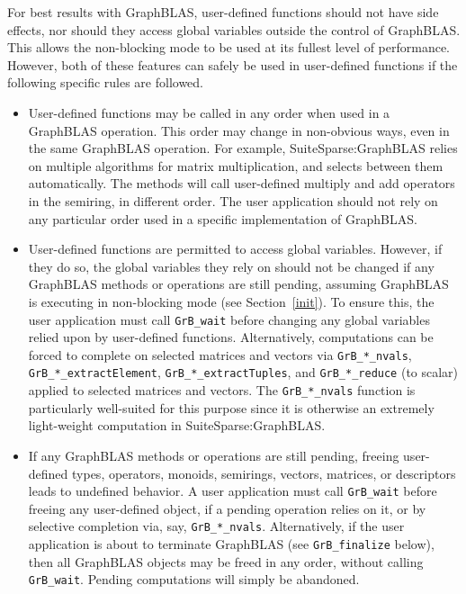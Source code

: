 \documentclass[12pt]{article}
\begin{document}
For best results with GraphBLAS, user-defined functions should not have side
effects, nor should they access global variables outside the control of
GraphBLAS.  This allows the non-blocking mode to be used at its fullest level
of performance.  However, both of these features can safely be used in
user-defined functions if the following specific rules are followed.

\begin{itemize}

\item User-defined functions may be called in any order when used in a
    GraphBLAS operation.  This order may change in non-obvious ways, even in
    the same GraphBLAS operation.  For example, SuiteSparse:\-GraphBLAS relies
    on multiple algorithms for matrix multiplication, and selects between them
    automatically.  The methods will call user-defined multiply and add
    operators in the semiring, in different order.  The user application should
    not rely on any particular order used in a specific implementation of
    GraphBLAS.

\item User-defined functions are permitted to access global variables.
    However, if they do so, the global variables they rely on should not be
    changed if any GraphBLAS methods or operations are still pending, assuming
    GraphBLAS is executing in non-blocking mode (see Section~\ref{init}).  To
    ensure this, the user application must call \verb'GrB_wait' before changing
    any global variables relied upon by user-defined functions.  Alternatively,
    computations can be forced to complete on selected matrices and vectors via
    \verb'GrB_*_nvals', \verb'GrB_*_extractElement',
    \verb'GrB_*_extractTuples', and \verb'GrB_*_reduce' (to scalar) applied to
    selected matrices and vectors.  The \verb'GrB_*_nvals' function is
    particularly well-suited for this purpose since it is otherwise an
    extremely light-weight computation in SuiteSparse:GraphBLAS.

\item If any GraphBLAS methods or operations are still pending, freeing
    user-defined types, operators, monoids, semirings, vectors, matrices, or
    descriptors leads to undefined behavior.  A user application must call
    \verb'GrB_wait' before freeing any user-defined object, if a pending
    operation relies on it, or by selective completion via, say,
    \verb'GrB_*_nvals'.  Alternatively, if the user application is about to
    terminate GraphBLAS (see \verb'GrB_finalize' below), then all GraphBLAS
    objects may be freed in any order, without calling \verb'GrB_wait'.
    Pending computations will simply be abandoned.

\end{itemize}
\end{document}
